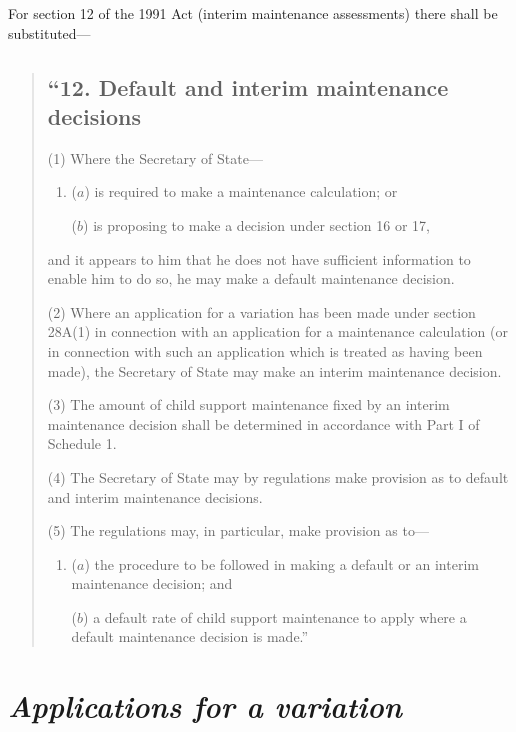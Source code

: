 \documentclass[12pt,a4paper]{article}
\begin{document}
For section 12 of the 1991 Act (interim maintenance assessments) there shall be substituted—
\begin{quotation}
\subsection*{“12. Default and interim maintenance decisions}

(1) Where the Secretary of State—
\begin{enumerate}\item[]
($a$) is required to make a maintenance calculation; or

($b$) is proposing to make a decision under section 16 or 17,
\end{enumerate}
and it appears to him that he does not have sufficient information to enable him to do so, he may make a default maintenance decision.

(2) Where an application for a variation has been made under section 28A(1)  in connection with an application for a maintenance calculation (or in connection with such an application which is treated as having been made), the Secretary of State may make an interim maintenance decision.

(3) The amount of child support maintenance fixed by an interim maintenance decision shall be determined in accordance with Part I of Schedule 1. 

(4) The Secretary of State may by regulations make provision as to default and interim maintenance decisions.

(5) The regulations may, in particular, make provision as to—
\begin{enumerate}\item[]
($a$) the procedure to be followed in making a default or an interim maintenance decision; and

($b$) a default rate of child support maintenance to apply where a default maintenance decision is made.”
\end{enumerate}
\end{quotation}


\section{\itshape Applications for a variation}
\end{document}
